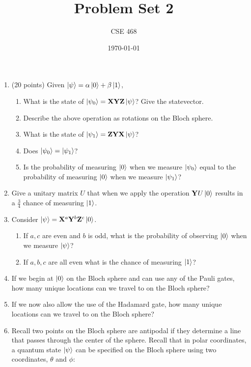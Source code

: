 \documentclass[12pt]{article}
\title{Problem Set 2}
\author{CSE 468}
\date{\today}
\begin{document}
\maketitle

\begin{enumerate}[font=\bfseries]
    \item (20 points) Given $\ket{\psi} = \alpha\ket{0} + \beta\ket{1}$,
    \begin{enumerate}
        \item What is the state of $\ket{\psi_0} = \mathbf{X}\mathbf{Y}\mathbf{Z}\ket{\psi}$? Give the statevector.
        \item Describe the above operation as rotations on the Bloch sphere.
        \item What is the state of $\ket{\psi_1} = \mathbf{Z}\mathbf{Y}\mathbf{X}\ket{\psi}$?
        \item Does $\ket{\psi_0} = \ket{\psi_1}$?
        \item Is the probability of measuring $\ket{0}$ when we measure $\ket{\psi_0}$ equal to the probability of measuring $\ket{0}$ when we measure $\ket{\psi_1}$?
    \end{enumerate}
    \item Give a unitary matrix $U$ that when we apply the operation $\mathbf{Y}U\ket{0}$ results in a $\frac{3}{4}$ chance of measuring $\ket{1}$. 
    \item Consider $\ket{\psi} = \mathbf{X}^a\mathbf{Y}^b\mathbf{Z}^c\ket{0}$.
    \begin{enumerate}
        \item If $a,c$ are even and $b$ is odd, what is the probability of observing $\ket{0}$ when we measure $\ket{\psi}$?
        \item If $a,b,c$ are all even what is the chance of measuring $\ket{1}$?
    \end{enumerate}
    \item If we begin at $\ket{0}$ on the Bloch sphere and can use any of the Pauli gates, how many unique locations can we travel to on the Bloch sphere?
    \item If we now also allow the use of the Hadamard gate, how many unique locations can we travel to on the Bloch sphere?
    \item Recall two points on the Bloch sphere are antipodal if they determine a line that passes through the center of the sphere. Recall that in polar coordinates, a quantum state $\ket{\psi}$ can be specified on the Bloch sphere using two coordinates, $\theta$ and $\phi$:

\end{enumerate}
\end{document}
